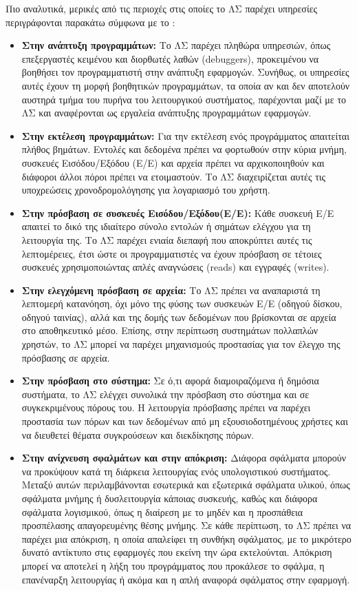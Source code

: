 Πιο αναλυτικά, μερικές από τις περιοχές στις οποίες το ΛΣ παρέχει υπηρεσίες περιγράφονται παρακάτω σύμφωνα με το \cite{stallings}:

\begin{itemize}
	\item \textbf{Στην ανάπτυξη προγραμμάτων:} Το ΛΣ παρέχει πληθώρα υπηρεσιών, όπως επεξεργαστές κειμένου και διορθωτές λαθών (debuggers), προκειμένου να βοηθήσει τον προγραμματιστή στην ανάπτυξη εφαρμογών. Συνήθως, οι υπηρεσίες αυτές έχουν τη μορφή βοηθητικών προγραμμάτων, τα οποία αν και δεν αποτελούν αυστηρά τμήμα του πυρήνα του λειτουργικού συστήματος, παρέχονται μαζί με το ΛΣ και αναφέρονται ως εργαλεία ανάπτυξης προγραμμάτων εφαρμογών.
	\item \textbf{Στην εκτέλεση προγραμμάτων:} Για την εκτέλεση ενός προγράμματος απαιτείται πλήθος βημάτων. Εντολές και δεδομένα πρέπει να φορτωθούν στην κύρια μνήμη, συσκευές Εισόδου/Εξόδου (Ε/Ε) και αρχεία πρέπει να αρχικοποιηθούν και διάφοροι άλλοι πόροι πρέπει να ετοιμαστούν. Το ΛΣ διαχειρίζεται αυτές τις υποχρεώσεις χρονοδρομολόγησης για λογαριασμό του χρήστη.
	\item \textbf{Στην πρόσβαση σε συσκευές Εισόδου/Εξόδου(Ε/Ε):} Κάθε συσκευή Ε/Ε απαιτεί το δικό της ιδιαίτερο σύνολο εντολών ή σημάτων ελέγχου για τη λειτουργία της. Το ΛΣ παρέχει ενιαία διεπαφή που αποκρύπτει αυτές τις λεπτομέρειες, έτσι ώστε οι προγραμματιστές να έχουν πρόσβαση σε τέτοιες συσκευές χρησιμοποιώντας απλές αναγνώσεις (reads) και εγγραφές (writes).
	\item \textbf{Στην ελεγχόμενη πρόσβαση σε αρχεία:} Το ΛΣ πρέπει να αναπαριστά τη λεπτομερή κατανόηση, όχι μόνο της φύσης των συσκευών Ε/Ε (οδηγού δίσκου, οδηγού ταινίας), αλλά και της δομής των δεδομένων που βρίσκονται σε αρχεία στο αποθηκευτικό μέσο. Επίσης, στην περίπτωση συστημάτων πολλαπλών χρηστών, το ΛΣ μπορεί να παρέχει μηχανισμούς προστασίας για τον έλεγχο της πρόσβασης σε αρχεία.
	\item \textbf{Στην πρόσβαση στο σύστημα:} Σε ό,τι αφορά διαμοιραζόμενα ή δημόσια συστήματα, το ΛΣ ελέγχει συνολικά την πρόσβαση στο σύστημα και σε συγκεκριμένους πόρους του. Η λειτουργία πρόσβασης πρέπει να παρέχει προστασία των πόρων και των δεδομένων από μη εξουσιοδοτημένους χρήστες και να διευθετεί θέματα συγκρούσεων και διεκδίκησης πόρων.
	\item \textbf{Στην ανίχνευση σφαλμάτων και στην απόκριση:} Διάφορα σφάλματα μπορούν να προκύψουν κατά τη διάρκεια λειτουργίας ενός υπολογιστικού συστήματος. Μεταξύ αυτών περιλαμβάνονται εσωτερικά και εξωτερικά σφάλματα υλικού, όπως σφάλματα μνήμης ή δυσλειτουργία κάποιας συσκευής, καθώς και διάφορα σφάλματα λογισμικού, όπως η διαίρεση με το μηδέν και η προσπάθεια προσπέλασης απαγορευμένης θέσης μνήμης. Σε κάθε περίπτωση, το ΛΣ πρέπει να παρέχει μια απόκριση, η οποία απαλείφει τη συνθήκη σφάλματος, με το μικρότερο δυνατό αντίκτυπο στις εφαρμογές που εκείνη την ώρα εκτελούνται. Απόκριση μπορεί να αποτελεί η λήξη του προγράμματος που προκάλεσε το σφάλμα, η επανέναρξη λειτουργίας ή ακόμα και η απλή αναφορά σφάλματος στην εφαρμογή.

\end{itemize}

